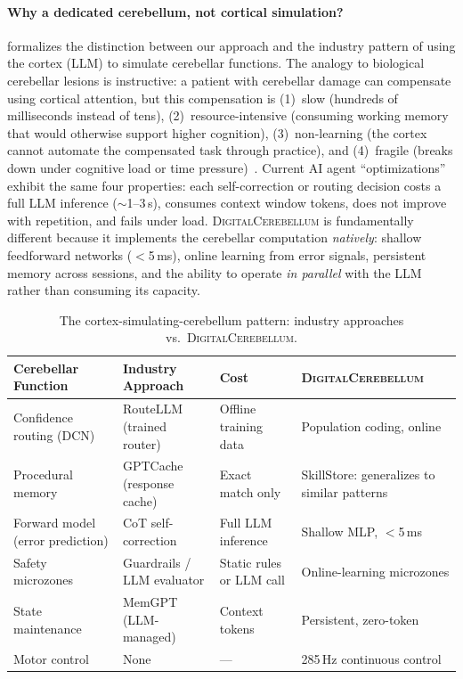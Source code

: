 \documentclass[11pt,a4paper]{article}
\newcommand{\cb}{\textsc{DigitalCerebellum}}
\begin{document}
\paragraph{Why a dedicated cerebellum, not cortical simulation?}
 formalizes the distinction between our approach and the industry pattern of using the cortex (LLM) to simulate cerebellar functions.
The analogy to biological cerebellar lesions is instructive: a patient with cerebellar damage can compensate using cortical attention, but this compensation is (1)~slow (hundreds of milliseconds instead of tens), (2)~resource-intensive (consuming working memory that would otherwise support higher cognition), (3)~non-learning (the cortex cannot automate the compensated task through practice), and (4)~fragile (breaks down under cognitive load or time pressure)~\citep{schmahmann2019cerebellar}.
Current AI agent ``optimizations'' exhibit the same four properties: each self-correction or routing decision costs a full LLM inference ($\sim$1--3\,s), consumes context window tokens, does not improve with repetition, and fails under load.
\cb{} is fundamentally different because it implements the cerebellar computation \emph{natively}: shallow feedforward networks ($<$5\,ms), online learning from error signals, persistent memory across sessions, and the ability to operate \emph{in parallel} with the LLM rather than consuming its capacity.

\begin{table}[t]
\centering
\caption{The cortex-simulating-cerebellum pattern: industry approaches vs.\ \cb{}.}
\label{tab:cortex_vs_cerebellum}
\begin{tabular}{p{2.8cm}p{3.2cm}p{2.8cm}p{3.8cm}}
\toprule
Cerebellar Function & Industry Approach & Cost & \cb{} \\
\midrule
Confidence routing (DCN) & RouteLLM (trained router) & Offline training data & Population coding, online & \\
Procedural memory & GPTCache (response cache) & Exact match only & SkillStore: generalizes to similar patterns \\
Forward model (error prediction) & CoT self-correction & Full LLM inference & Shallow MLP, $<$5\,ms \\
Safety microzones & Guardrails / LLM evaluator & Static rules or LLM call & Online-learning microzones \\
State maintenance & MemGPT (LLM-managed) & Context tokens & Persistent, zero-token \\
Motor control & None & --- & 285\,Hz continuous control \\
\bottomrule
\end{tabular}
\end{table}
\end{document}
